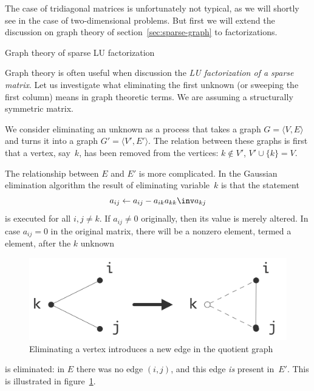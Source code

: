 The case of tridiagonal matrices is unfortunately not typical, as we
will shortly see in the case of two-dimensional problems. But first we
will extend the discussion on graph theory of
section~\ref{sec:sparse-graph} to factorizations.

 {Graph theory of sparse LU factorization}
\label{sec:lu-graph}

Graph theory is often useful when discussion the
%
\emph{LU factorization of a sparse matrix}.
%
Let us investigate what eliminating the first unknown
(or sweeping the first column) means in graph theoretic terms. We are
assuming a structurally symmetric matrix.

We consider eliminating an unknown as a process
that takes a graph $G=\langle V,E\rangle$ and
turns it into a graph $G'=\langle V',E'\rangle$. The relation between
these graphs is first that a vertex, say~$k$,
has been removed from the vertices:
$k\not\in V'$, $V'\cup \{k\}=V$.

The relationship between $E$ and $E'$ is more complicated. In the
Gaussian elimination algorithm the result of eliminating variable~$k$ is
that the statement
\[ a_{ij} \leftarrow a_{ij}- a_{ik}a_{kk}\inv a_{kj} \]
is executed for all $i,j\not=k$. If $a_{ij}\not=0$ originally, then
its value is merely altered. In case $a_{ij}=0$ in the original
matrix, there will be a nonzero element, termed a 
element, after the $k$ unknown
\begin{figure}[ht]
  \includegraphics[scale=.12]{graphics/ijk-eliminate}
  \caption{Eliminating a vertex introduces a new edge in the quotient
    graph}
  \label{fig:ijk-eliminate}
\end{figure}
is eliminated: in $E$ there was no edge $(i,j)$, and
this edge \emph{is} present in~$E'$. This is illustrated in
figure~\ref{fig:ijk-eliminate}.

